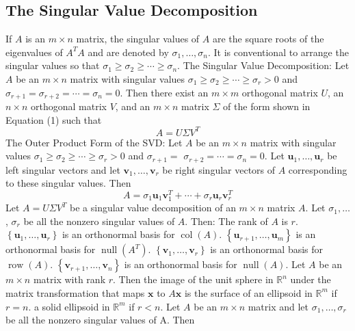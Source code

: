 \documentclass{article}
\begin{document}
    \subsection{The Singular Value Decomposition} 
    \begin{outline}
        \1 If $A$ is an $m \times n$ matrix, the singular values of $A$ are the square roots of the eigenvalues of $A^{T} A$ and are denoted by $\sigma_{1}, \ldots, \sigma_{n}$. It is conventional to arrange the singular values so that $\sigma_{1} \geq \sigma_{2} \geq \cdots \geq \sigma_{n}$.
        \1 The Singular Value Decomposition: Let $A$ be an $m \times n$ matrix with singular values $\sigma_{1} \geq \sigma_{2} \geq \cdots \geq \sigma_{r}>0$ and $\sigma_{r+1}=\sigma_{r+2}=\cdots=\sigma_{n}=0$. Then there exist an $m \times m$ orthogonal matrix $U$, an $n \times n$ orthogonal matrix $V$, and an $m \times n$ matrix $\Sigma$ of the form shown in Equation (1) such that
        \[A=U \Sigma V^{T}\]
        \1 The Outer Product Form of the SVD: Let $A$ be an $m \times n$ matrix with singular values $\sigma_{1} \geq \sigma_{2} \geq \cdots \geq \sigma_{r}>0$ and $\sigma_{r+1}=$ $\sigma_{r+2}=\cdots=\sigma_{n}=0$. Let $\mathbf{u}_{1}, \ldots, \mathbf{u}_{r}$ be left singular vectors and let $\mathbf{v}_{1}, \ldots, \mathbf{v}_{r}$ be right singular vectors of $A$ corresponding to these singular values. Then
        \[A=\sigma_{1} \mathbf{u}_{1} \mathbf{v}_{1}^{T}+\cdots+\sigma_{r} \mathbf{u}_{r} \mathbf{v}_{r}^{T}\]
        \1 Let $A=U \Sigma V^{T}$ be a singular value decomposition of an $m \times n$ matrix $A$. Let $\sigma_{1}, \ldots$, $\sigma_{r}$ be all the nonzero singular values of $A$. Then:
            \2 The rank of $A$ is $r$.
            \2 $\left\{\mathbf{u}_{1}, \ldots, \mathbf{u}_{r}\right\}$ is an orthonormal basis for $\operatorname{col}(A)$.
            \2 $\left\{\mathbf{u}_{r+1}, \ldots, \mathbf{u}_{m}\right\}$ is an orthonormal basis for $\operatorname{null}\left(A^{T}\right)$.
            \2 $\left\{\mathbf{v}_{1}, \ldots, \mathbf{v}_{r}\right\}$ is an orthonormal basis for $\operatorname{row}(A)$.
            \2 $\left\{\mathbf{v}_{r+1}, \ldots, \mathbf{v}_{n}\right\}$ is an orthonormal basis for $\operatorname{null}(A)$.
        \1 Let $A$ be an $m \times n$ matrix with rank $r$. Then the image of the unit sphere in $\mathbb{R}^{n}$ under the matrix transformation that maps $\mathbf{x}$ to $A \mathbf{x}$ is
            \2 the surface of an ellipsoid in $\mathbb{R}^{m}$ if $r=n$.
            \2 a solid ellipsoid in $\mathbb{R}^{m}$ if $r<n$.
        \1 Let $A$ be an $m \times n$ matrix and let $\sigma_{1}, \ldots, \sigma_{r}$ be all the nonzero singular values of A. Then

\end{outline}
\end{document}
